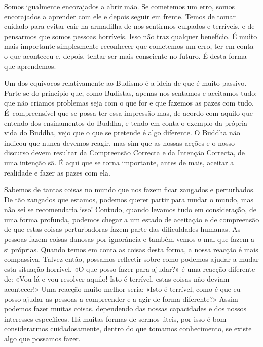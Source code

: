 Somos igualmente encorajados a abrir mão. Se cometemos um erro, somos
encorajados a aprender com ele e depois seguir em frente. Temos de tomar
cuidado para evitar cair na armadilha de nos sentirmos culpados e
terríveis, e de pensarmos que somos pessoas horríveis. Isso não traz
qualquer benefício. É muito mais importante simplesmente reconhecer que
cometemos um erro, ter em conta o que aconteceu e, depois, tentar ser
mais consciente no futuro. É desta forma que aprendemos.

Um dos equívocos relativamente ao Budismo é a ideia de que é muito
passivo. Parte-se do princípio que, como Budistas, apenas nos sentamos e
aceitamos tudo; que não criamos problemas seja com o que for e que
fazemos as pazes com tudo. É~compreensível que se possa ter essa
impressão mas, de acordo com aquilo que entendo dos ensinamentos do
Buddha, e tendo em conta o exemplo da própria vida do Buddha, vejo que o
que se pretende é algo diferente. O Buddha não indicou que nunca devemos
reagir, mas sim que as nossas acções e o nosso discurso devem resultar
da Compreensão Correcta e da Intenção Correcta, de uma intenção sã. É
aqui que se torna importante, antes de mais, aceitar a realidade e fazer
as pazes com ela.

Sabemos de tantas coisas no mundo que nos fazem ficar zangados e
perturbados. De tão zangados que estamos, podemos querer partir para
mudar o mundo, mas não sei se recomendaria isso! Contudo, quando levamos
tudo em consideração, de uma forma profunda, podemos chegar a um estado
de aceitação e de compreensão de que estas coisas perturbadoras fazem
parte das dificuldades humanas. As pessoas fazem coisas danosas por
ignorância e também vemos o mal que fazem a si próprias. Quando temos em
conta as coisas desta forma, a nossa reacção é mais compassiva. Talvez
então, possamos reflectir sobre como podemos ajudar a mudar esta
situação horrível. «O que posso fazer para ajudar?» é uma reacção
diferente de: «Vou lá e vou resolver aquilo! Isto é terrível, estas
coisas não deviam acontecer!» Uma reacção muito melhor seria: «Isto é
terrível, como é que eu posso ajudar as pessoas a compreender e a agir
de forma diferente?» Assim podemos fazer muitas coisas, dependendo das
nossas capacidades e dos nossos interesses específicos. Há muitas formas
de sermos úteis, por isso é bom considerarmos cuidadosamente, dentro do
que tomamos conhecimento, se existe algo que possamos fazer.

